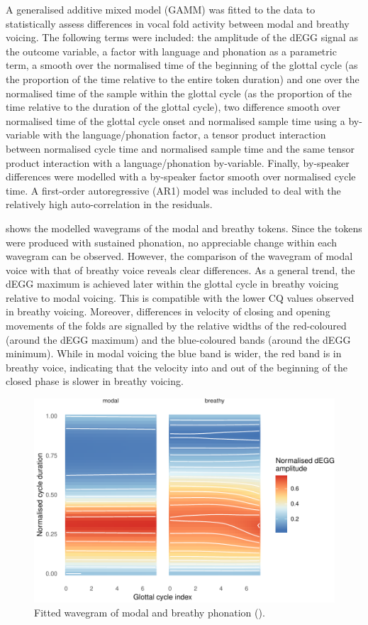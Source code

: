 \documentclass[
  11pt,
  a4paper,
]{article}
\begin{document}
A generalised additive mixed model (GAMM) was fitted to the data to
statistically assess differences in vocal fold activity between modal
and breathy voicing. The following terms were included: the amplitude of
the dEGG signal as the outcome variable, a factor with language and
phonation as a parametric term, a smooth over the normalised time of the
beginning of the glottal cycle (as the proportion of the time relative
to the entire token duration) and one over the normalised time of the
sample within the glottal cycle (as the proportion of the time relative
to the duration of the glottal cycle), two difference smooth over
normalised time of the glottal cycle onset and normalised sample time
using a by-variable with the language/phonation factor, a tensor product
interaction between normalised cycle time and normalised sample time and
the same tensor product interaction with a language/phonation
by-variable. Finally, by-speaker differences were modelled with a
by-speaker factor smooth over normalised cycle time. A first-order
autoregressive (AR1) model was included to deal with the relatively high
auto-correlation in the residuals.

 shows the modelled wavegrams of the modal and breathy
tokens. Since the tokens were produced with sustained phonation, no
appreciable change within each wavegram can be observed. However, the
comparison of the wavegram of modal voice with that of breathy voice
reveals clear differences. As a general trend, the dEGG maximum is
achieved later within the glottal cycle in breathy voicing relative to
modal voicing. This is compatible with the lower CQ values observed in
breathy voicing. Moreover, differences in velocity of closing and
opening movements of the folds are signalled by the relative widths of
the red-coloured (around the dEGG maximum) and the blue-coloured bands
(around the dEGG minimum). While in modal voicing the blue band is
wider, the red band is in breathy voice, indicating that the velocity
into and out of the beginning of the closed phase is slower in breathy
voicing.

\begin{figure}
\includegraphics[width=\linewidth]{2019-wavegram_files/figure-latex/surface-p-1} \caption{Fitted wavegram of modal and breathy phonation ().}\label{f:surface-p}
\end{figure}
\end{document}
